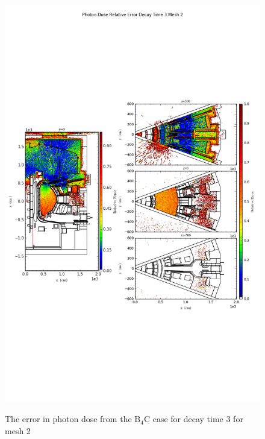 \begin{figure}[ht!]
\centering
\includegraphics[trim={0cm 9cm 0cm 10cm},clip,scale=0.75]{../plots/final_model_nob4c/Photon_Dose_Relative_Error_Decay_Time_3_Mesh_2.png}
\label{fig:photons_dc3_no4bc_m2_error}
\caption{The error in photon dose from the B$_4$C case for decay time 3 for mesh 2}
\end{figure}
